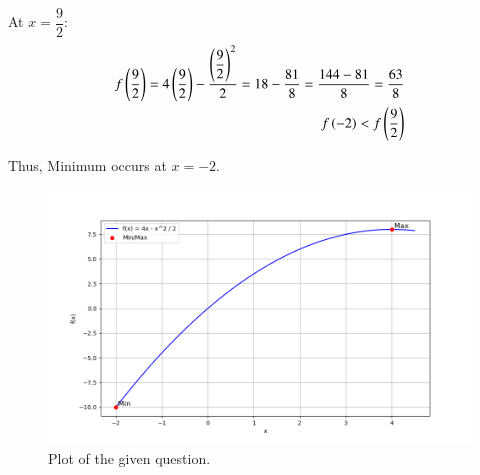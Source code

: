 \documentclass[journal]{IEEEtran}
\numberwithin{equation}{enumi}
\numberwithin{figure}{enumi}
\begin{document}
At $ x = \dfrac{9}{2} $:
\begin{align}
f\left(\dfrac{9}{2}\right) = 4\left(\dfrac{9}{2}\right) - \dfrac{\left(\dfrac{9}{2}\right)^2}{2} = 18 - \dfrac{81}{8} = \dfrac{144 - 81}{8} = \dfrac{63}{8}\\
f\left(-2\right) < f\left(\frac{9}{2}\right)
\end{align}

Thus, Minimum occurs at $x=-2$.
\begin{figure}[h]
\centering
\includegraphics[width=\columnwidth]{Figs/Figure_1.png}
\caption{Plot of the given question.}
\label{fig:Plot1} 
\end{figure}
\end{document}
